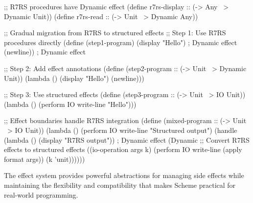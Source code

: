\begin{example}[R7RS Integration]
\begin{lambdustcode}
;; R7RS procedures have Dynamic effect
(define r7rs-display :: (-> Any ~> {Dynamic} Unit))
(define r7rs-read :: (-> Unit ~> {Dynamic} Any))

;; Gradual migration from R7RS to structured effects
;; Step 1: Use R7RS procedures directly  
(define (step1-program)
  (display "Hello")     ; Dynamic effect
  (newline))           ; Dynamic effect

;; Step 2: Add effect annotations
(define (step2-program :: (-> Unit ~> {Dynamic} Unit))
  (lambda ()
    (display "Hello")
    (newline)))

;; Step 3: Use structured effects
(define (step3-program :: (-> Unit ~> {IO} Unit))
  (lambda ()
    (perform IO write-line "Hello")))

;; Effect boundaries handle R7RS integration
(define (mixed-program :: (-> Unit ~> {IO} Unit))
  (lambda ()
    (perform IO write-line "Structured output")
    (handle 
      (lambda () (display "R7RS output"))   ; Dynamic effect
      (Dynamic 
        ;; Convert R7RS effects to structured effects  
        ((io-operation args k) (perform IO write-line (apply format args)) (k 'unit))))))
\end{lambdustcode}
\end{example}

The effect system provides powerful abstractions for managing side effects while maintaining the flexibility and compatibility that makes Scheme practical for real-world programming.